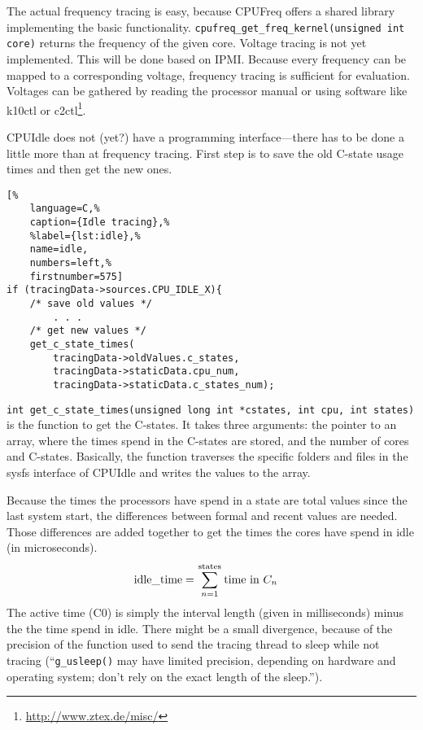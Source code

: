 The actual frequency tracing is easy, because CPUFreq offers a shared library implementing the basic functionality.
%
%
\lstinline!cpufreq_get_freq_kernel(unsigned int core)! returns the frequency of the given core. Voltage tracing is not yet implemented. This will be done based on IPMI. Because every frequency can be mapped to a corresponding voltage, frequency tracing is sufficient for evaluation. Voltages can be gathered by reading the processor manual or using software like k10ctl or c2ctl\footnote{\url{http://www.ztex.de/misc/}}.

CPUIdle does not (yet?) have a programming interface---there has to be done a little more than at frequency tracing. First step is to save the old C-state usage times and then get the new ones.

%
\begin{lstlisting}[%
	language=C,%
	caption={Idle tracing},%
	%label={lst:idle},%
	name=idle,
	numbers=left,%
	firstnumber=575]
if (tracingData->sources.CPU_IDLE_X){
	/* save old values */
		. . .
	/* get new values */
	get_c_state_times(
		tracingData->oldValues.c_states, 
		tracingData->staticData.cpu_num,
		tracingData->staticData.c_states_num);
\end{lstlisting}
%

\noindent
\lstinline!int get_c_state_times(unsigned long int *cstates, int cpu, int states)! is the function to get the C-states. It takes three arguments: the pointer to an array, where the times spend in the C-states are stored, and the number of cores and C-states. Basically, the function traverses the specific folders and files in the sysfs interface of CPUIdle and writes the values to the array\cite{powertop}.

Because the times the processors have spend in a state are total values since the last system start, the differences between formal and recent values are needed. Those differences are added together to get the times the cores have spend in idle (in microseconds).
\begin{align*}
	\text{\lstinline!idle_time!} &= \sum\limits_{n=1}^{\text{\lstinline!states!}} \text{time in } C_n
\end{align*}
The active time (C0) is simply the interval length (given in milliseconds) minus the the time spend in idle. There might be a small divergence, because of the precision of the function used to send the tracing thread to sleep while not tracing (``\lstinline!g_usleep()! may have limited precision, depending on hardware and operating system; don't rely on the exact length of the sleep\cite{glib}.''). 

